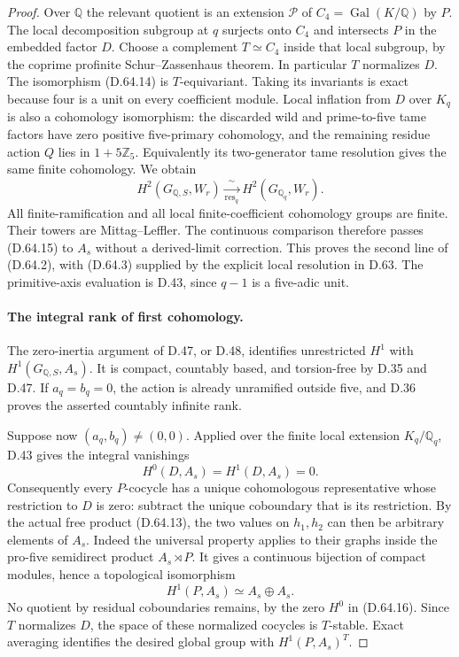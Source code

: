\begin{proof}
Over \(\mathbb Q\) the relevant quotient is an extension
\(\mathcal P\) of \(C_4=\operatorname{Gal}(K/\mathbb Q)\)
by \(P\). The local decomposition subgroup at \(q\)
surjects onto \(C_4\) and intersects \(P\) in the
embedded factor \(D\). Choose a complement \(T\simeq C_4\)
inside that local subgroup, by the coprime profinite
Schur--Zassenhaus theorem. In particular \(T\) normalizes
\(D\). The isomorphism (D.64.14) is \(T\)-equivariant.
Taking its invariants is exact because four is a unit
on every coefficient module. Local inflation from
\(D\) over \(K_q\) is also a cohomology isomorphism:
the discarded wild and prime-to-five tame factors have
zero positive five-primary cohomology, and the
remaining residue action \(Q\) lies in \(1+5\mathbb Z_5\).
Equivalently its two-generator tame resolution gives
the same finite cohomology. We obtain
\[
 H^2(G_{\mathbb Q,S},W_r)
      \xrightarrow[\mathrm{res}_q]{\ \sim\ }
                         H^2(G_{\mathbb Q_q},W_r).
                                                        \tag{D.64.15}
\]
All finite-ramification and all local finite-coefficient
cohomology groups are finite. Their towers are
Mittag--Leffler. The continuous comparison therefore
passes (D.64.15) to \(A_s\) without a derived-limit
correction. This proves the second line of (D.64.2),
with (D.64.3) supplied by the explicit local resolution
in D.63. The primitive-axis evaluation is D.43, since
\(q-1\) is a five-adic unit.

\paragraph{The integral rank of first cohomology.}
The zero-inertia argument of D.47, or D.48, identifies
unrestricted \(H^1\) with \(H^1(G_{\mathbb Q,S},A_s)\).
It is compact, countably based, and torsion-free by
D.35 and D.47. If \(a_q=b_q=0\), the action is already
unramified outside five, and D.36 proves the asserted
countably infinite rank.

Suppose now \((a_q,b_q)\ne(0,0)\). Applied over the finite
local extension \(K_q/\mathbb Q_q\), D.43 gives the
integral vanishings
\[
                       H^0(D,A_s)=H^1(D,A_s)=0.
                                                        \tag{D.64.16}
\]
Consequently every \(P\)-cocycle has a unique cohomologous
representative whose restriction to \(D\) is zero: subtract
the unique coboundary that is its restriction. By the
actual free product (D.64.13), the two values on
\(h_1,h_2\) can then be arbitrary elements of \(A_s\).
Indeed the universal property applies to their graphs
inside the pro-five semidirect product \(A_s\rtimes P\).
It gives a continuous bijection of compact modules,
hence a topological isomorphism
\[
              H^1(P,A_s)\simeq A_s\oplus A_s.
                                                        \tag{D.64.17}
\]
No quotient by residual coboundaries remains, by the
zero \(H^0\) in (D.64.16). Since \(T\) normalizes \(D\),
the space of these normalized cocycles is \(T\)-stable.
Exact averaging identifies the desired global group
with \(H^1(P,A_s)^T\).


\end{proof}
